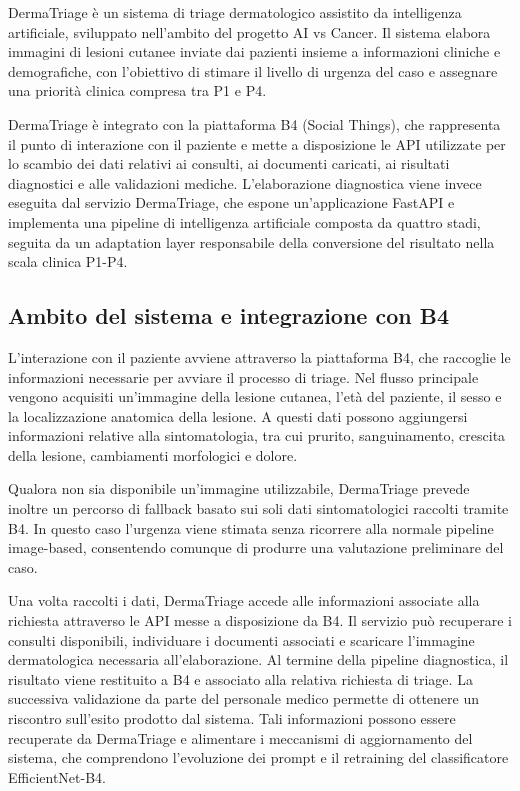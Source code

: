 DermaTriage è un sistema di triage dermatologico assistito da intelligenza artificiale, sviluppato nell'ambito del progetto AI vs Cancer. Il sistema elabora immagini di lesioni cutanee inviate dai pazienti insieme a informazioni cliniche e demografiche, con l'obiettivo di stimare il livello di urgenza del caso e assegnare una priorità clinica compresa tra P1 e P4.

DermaTriage è integrato con la piattaforma B4 (Social Things), che rappresenta il punto di interazione con il paziente e mette a disposizione le API utilizzate per lo scambio dei dati relativi ai consulti, ai documenti caricati, ai risultati diagnostici e alle validazioni mediche. L'elaborazione diagnostica viene invece eseguita dal servizio DermaTriage, che espone un'applicazione FastAPI e implementa una pipeline di intelligenza artificiale composta da quattro stadi, seguita da un adaptation layer responsabile della conversione del risultato nella scala clinica P1-P4.

\subsection{Ambito del sistema e integrazione con B4}
L'interazione con il paziente avviene attraverso la piattaforma B4, che raccoglie le informazioni necessarie per avviare il processo di triage. Nel flusso principale vengono acquisiti un'immagine della lesione cutanea, l'età del paziente, il sesso e la localizzazione anatomica della lesione. A questi dati possono aggiungersi informazioni relative alla sintomatologia, tra cui prurito, sanguinamento, crescita della lesione, cambiamenti morfologici e dolore.

Qualora non sia disponibile un'immagine utilizzabile, DermaTriage prevede inoltre un percorso di fallback basato sui soli dati sintomatologici raccolti tramite B4. In questo caso l'urgenza viene stimata senza ricorrere alla normale pipeline image-based, consentendo comunque di produrre una valutazione preliminare del caso.

Una volta raccolti i dati, DermaTriage accede alle informazioni associate alla richiesta attraverso le API messe a disposizione da B4. Il servizio può recuperare i consulti disponibili, individuare i documenti associati e scaricare l'immagine dermatologica necessaria all'elaborazione. Al termine della pipeline diagnostica, il risultato viene restituito a B4 e associato alla relativa richiesta di triage. La successiva validazione da parte del personale medico permette di ottenere un riscontro sull'esito prodotto dal
sistema. Tali informazioni possono essere recuperate da DermaTriage e alimentare i meccanismi di aggiornamento del sistema, che comprendono l'evoluzione dei prompt e il retraining del classificatore EfficientNet-B4.

